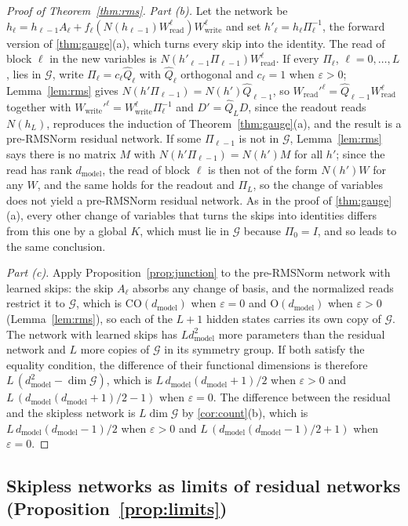 \documentclass[10pt]{article}
\theoremstyle{definition}
\theoremstyle{remark}
\newcommand{\Wread}{W_{\mathrm{read}}}
\newcommand{\Wwrite}{W_{\mathrm{write}}}
\newcommand{\dm}{d_{\mathrm{model}}}
\newcommand{\Ort}{\mathrm{O}}
\newcommand{\CO}{\mathrm{CO}}
\newcommand{\G}{\mathcal{G}}
\begin{document}
\begin{proof}[Proof of Theorem~\ref{thm:rms}]
\emph{Part (b).} Let the network be $h_\ell = h_{\ell-1}A_\ell + f_\ell(N(h_{\ell-1})\Wread^{\ell})\Wwrite^{\ell}$ and set $h'_\ell = h_\ell\Pi_\ell^{-1}$, the forward version of \cref{thm:gauge}(a), which turns every skip into the identity. The read of block $\ell$ in the new variables is $N(h'_{\ell-1}\Pi_{\ell-1})\Wread^{\ell}$. If every $\Pi_\ell$, $\ell = 0, \dots, L$, lies in $\G$, write $\Pi_\ell = c_\ell\hat Q_\ell$ with $\hat Q_\ell$ orthogonal and $c_\ell = 1$ when $\varepsilon > 0$; Lemma~\ref{lem:rms} gives $N(h'\Pi_{\ell-1}) = N(h')\hat Q_{\ell-1}$, so $\Wread'^{\ell} = \hat Q_{\ell-1}\Wread^{\ell}$ together with $\Wwrite'^{\ell} = \Wwrite^{\ell}\Pi_\ell^{-1}$ and $D' = \hat Q_LD$, since the readout reads $N(h_L)$, reproduces the induction of Theorem~\ref{thm:gauge}(a), and the result is a pre-RMSNorm residual network. If some $\Pi_{\ell-1}$ is not in $\G$, Lemma~\ref{lem:rms} says there is no matrix $M$ with $N(h'\Pi_{\ell-1}) = N(h')M$ for all $h'$; since the read has rank $\dm$, the read of block $\ell$ is then not of the form $N(h')W$ for any $W$, and the same holds for the readout and $\Pi_L$, so the change of variables does not yield a pre-RMSNorm residual network. As in the proof of \cref{thm:gauge}(a), every other change of variables that turns the skips into identities differs from this one by a global $K$, which must lie in $\G$ because $\Pi_0 = I$, and so leads to the same conclusion.

\emph{Part (c).} Apply Proposition~\ref{prop:junction} to the pre-RMSNorm network with learned skips: the skip $A_\ell$ absorbs any change of basis, and the normalized reads restrict it to $\G$, which is $\CO(\dm)$ when $\varepsilon = 0$ and $\Ort(\dm)$ when $\varepsilon > 0$ (Lemma~\ref{lem:rms}), so each of the $L+1$ hidden states carries its own copy of $\G$. The network with learned skips has $L\dm^2$ more parameters than the residual network and $L$ more copies of $\G$ in its symmetry group. If both satisfy the equality condition, the difference of their functional dimensions is therefore $L\,(\dm^2 - \dim\G)$, which is $L\,\dm(\dm+1)/2$ when $\varepsilon > 0$ and $L\,(\dm(\dm+1)/2 - 1)$ when $\varepsilon = 0$. The difference between the residual and the skipless network is $L\dim\G$ by \cref{cor:count}(b), which is $L\,\dm(\dm-1)/2$ when $\varepsilon > 0$ and $L\,(\dm(\dm-1)/2 + 1)$ when $\varepsilon = 0$.
\end{proof}

\subsection{Skipless networks as limits of residual networks\texorpdfstring{ (Proposition~\ref*{prop:limits})}{}}\label{app:prf-limits}
\end{document}
